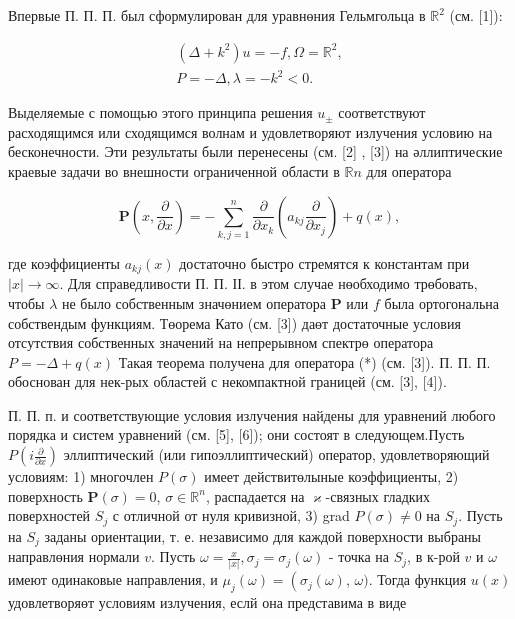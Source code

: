 \documentclass[10pt]{article}
\begin{document}
Впервые П. П. П. был сформулирован для уравнөния Гельмгольца в $\mathbb{R}^{2}$ (см. [1]):



\[

\begin{gathered}

\left(\Delta+k^{2}\right) u=-f, \Omega=\mathbb{R}^{2}, \\

P=-\Delta, \lambda=-k^{2}<0 .

\end{gathered}

\]



Выделяемые с помощью этого принципа решения $u_{ \pm}$ соответствуют расходящимся или сходящимся волнам и удовлетворяют излучения условию на бесконечности. Эти результаты были перенесены (см. [2] , [3]) на әллиптические краевые задачи во внешности ограниченной области в $\mathbb{R} n$ для оператора



\[

\boldsymbol{P}\left(x, \frac{\partial}{\partial x}\right)=-\sum_{k, j=1}^{n} \frac{\partial}{\partial x_{k}}\left(a_{k j} \frac{\partial}{\partial x_{j}}\right)+q(x),

\]



где коэффициенты $a_{k j}(x)$ достаточно быстро стремятся к константам при $|x| \rightarrow \infty$. Для справедливости П. П. ІІ. в этом случае нөобходимо трөбовать, чтобы $\lambda$ не было собственным значөнием оператора $\boldsymbol{P}$ или $f$ была ортогональна собствендым функциям. Төорема Като (см. [3]) даөт достаточные условия отсутствия собственных значений на непрерывном спектрө оператора $P=-\Delta+q(x)$ Такая теорема получена для оператора (*) (см. [3]). П. П. П. обоснован для нек-рых областей с некомпактной границей (см. [3], [4]).



П. П. п. и соответствующие условия излучения найдены для уравнений любого порядка и систем уравнений (см. [5], [6]); они состоят в следующем.Пусть $P\left(i \frac{\partial}{\partial x}\right)$ эллиптический (или гипоэллиптический) оператор, удовлетворяющий условиям: 1) многочлен $P(\sigma)$ имеет действитөлыные коэффициенты, 2) поверхность $\boldsymbol{P}(\sigma)=0$, $\sigma \in \mathbb{R}^{n}$, распадается на $\varkappa$-связных гладких поверхностей $S_{j}$ с отличной от нуля кривизной, 3) grad $P(\sigma) \neq 0$ на $S_{j}$. Пусть на $S_{j}$ заданы ориентации, т. е. независимо для каждой поверхности выбраны направлөния нормали $v$. Пусть $\omega=\frac{x}{|x|}, \sigma_{j}=\sigma_{j}(\omega)$ - точка на $S_{j}$, в к-рой $v$ и $\omega$ имеют одинаковые направления, и $\mu_{j}(\omega)=\left(\sigma_{j}(\omega)\right.$, $\omega)$. Тогда функция $u(x)$ удовлетворяөт условиям излучения, еслй она представима в виде
\end{document}
